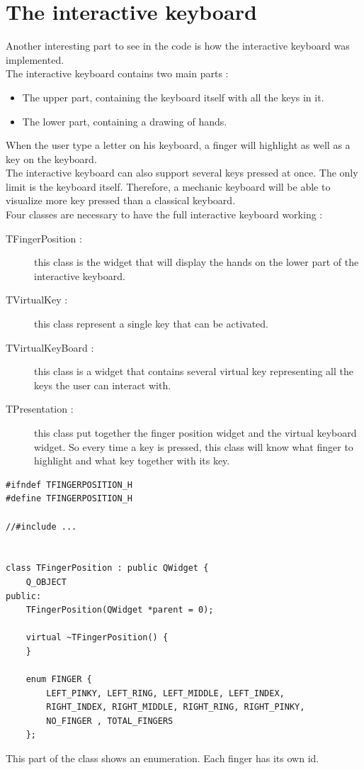 \section{The interactive keyboard}
Another interesting part to see in the code is how the interactive keyboard was implemented.\\
The interactive keyboard contains two main parts :
\begin{itemize}
	\item The upper part, containing the keyboard itself with all the keys in it.
	\item The lower part, containing a drawing of hands.
\end{itemize}
When the user type a letter on his keyboard, a finger will highlight as well as a key on the keyboard.\\
The interactive keyboard can also support several keys pressed at once. The only limit is the keyboard itself. Therefore, a mechanic keyboard will be able to visualize more key pressed than a classical keyboard.\\
Four classes are necessary to have the full interactive keyboard working :
\begin{description}
	\item[TFingerPosition : ] this class is the widget that will display the hands on the lower part of the interactive keyboard.
	\item[TVirtualKey : ] this class represent a single key that can be activated.
	\item[TVirtualKeyBoard :] this class is a widget that contains several virtual key representing all the keys the user can interact with.
	\item[TPresentation : ] this class put together the finger position widget and the virtual keyboard widget. So every time a key is pressed, this class will know what finger to highlight and what key together with its key.
\end{description}

\begin{lstlisting}
#ifndef TFINGERPOSITION_H
#define TFINGERPOSITION_H

//#include ...


class TFingerPosition : public QWidget {
    Q_OBJECT
public:
    TFingerPosition(QWidget *parent = 0);

    virtual ~TFingerPosition() {
    }

    enum FINGER {
        LEFT_PINKY, LEFT_RING, LEFT_MIDDLE, LEFT_INDEX, 
        RIGHT_INDEX, RIGHT_MIDDLE, RIGHT_RING, RIGHT_PINKY,
        NO_FINGER , TOTAL_FINGERS
    };
\end{lstlisting}
This part of the class shows an enumeration. Each finger has its own id.

